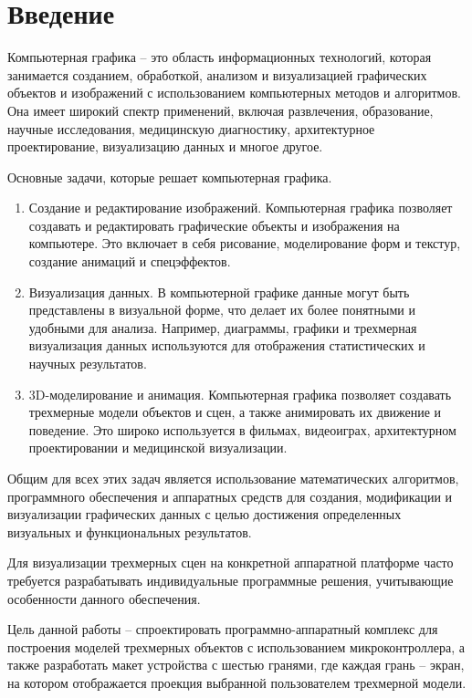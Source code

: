 \chapter*{Введение}

Компьютерная графика -- это область информационных технологий, которая занимается созданием, обработкой, анализом и визуализацией графических объектов и изображений с использованием компьютерных методов и алгоритмов. 
Она имеет широкий спектр применений, включая развлечения, образование, научные исследования, медицинскую диагностику, архитектурное проектирование, визуализацию данных и многое другое.

Основные задачи, которые решает компьютерная графика.
\begin{enumerate}[label={\arabic*)}]
	\item Создание и редактирование изображений. 
    Компьютерная графика позволяет создавать и редактировать графические объекты и изображения на компьютере. 
    Это включает в себя рисование, моделирование форм и текстур, создание анимаций и спецэффектов.
    \item Визуализация данных. 
    В компьютерной графике данные могут быть представлены в визуальной форме, что делает их более понятными и удобными для анализа. 
    Например, диаграммы, графики и трехмерная визуализация данных используются для отображения статистических и научных результатов.
    \item 3D-моделирование и анимация. 
    Компьютерная графика позволяет создавать трехмерные модели объектов и сцен, а также анимировать их движение и поведение. 
    Это широко используется в фильмах, видеоиграх, архитектурном проектировании и медицинской визуализации.
\end{enumerate}

Общим для всех этих задач является использование математических алгоритмов, программного обеспечения и аппаратных средств для создания, модификации и визуализации графических данных с целью достижения определенных визуальных и функциональных результатов.

Для визуализации трехмерных сцен на конкретной аппаратной платформе часто требуется разрабатывать индивидуальные программные решения, учитывающие особенности данного обеспечения.

Цель данной работы -- спроектировать программно-аппаратный комплекс для построения моделей трехмерных объектов с использованием микроконтроллера, а также разработать макет устройства с шестью гранями, где  каждая грань -- экран, на котором отображается проекция выбранной пользователем трехмерной модели.


